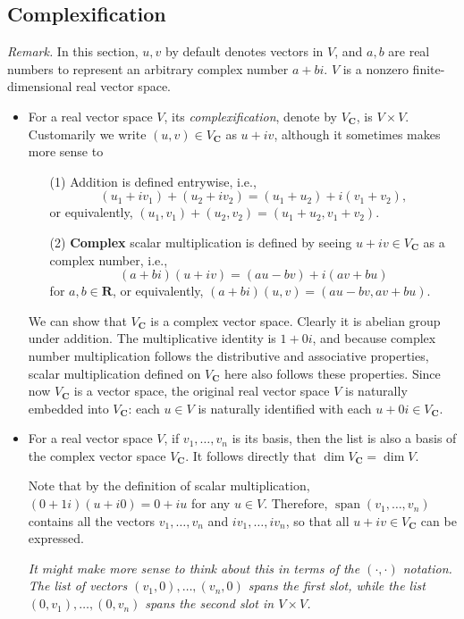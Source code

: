 \documentclass[11pt]{article}
\newcommand{\df}[1]{\textit{\textsf{#1}}}
\newcommand{\R}{\mathbf{R}}
\newcommand{\C}{\mathbf{C}}
\newcommand{\s}{\operatorname{span}}
\renewcommand{\d}{\dim}
\begin{document}
\subsection{Complexification}
\textit{Remark.} In this section, $u,v$ by default denotes vectors in $V$, and $a,b$ are real numbers to represent an arbitrary complex number $a+bi$. $V$ is a nonzero finite-dimensional real vector space.
\begin{itemize}
    \item For a real vector space $V$, its \df{complexification}, denote by $V_\C$, is $V \times V$. Customarily we write $(u,v) \in V_\C$ as $u + iv$, although it sometimes makes more sense to \emph{}
    \begin{enumerate}
        \item [(1)] Addition is defined entrywise, i.e., \[(u_1+iv_1)+(u_2+iv_2)=(u_1+u_2)+i(v_1+v_2),\] or equivalently, $(u_1,v_1)+(u_2,v_2) = (u_1+u_2,v_1+v_2)$.
        \item [(2)] \textbf{Complex} scalar multiplication is defined by seeing $u+iv \in V_\C$ as a complex number, i.e., \[(a+bi)(u+iv) = (au-bv)+i(av+bu)\] for $a,b \in \R$, or equivalently, $(a+bi)(u,v) = (au-bv,av+bu)$.
    \end{enumerate}

    We can show that $V_\C$ is a complex vector space. Clearly it is abelian group under addition. The multiplicative identity is $1+0i$, and because complex number multiplication follows the distributive and associative properties, scalar multiplication defined on $V_\C$ here also follows these properties. Since now $V_\C$ is a vector space, the original real vector space $V$ is naturally embedded into $V_\C$: each $u \in V$ is naturally identified with each $u+0i \in V_\C$.
    \item For a real vector space $V$, if $v_1,\dots,v_n$ is its basis, then the list is also a basis of the complex vector space $V_\C$. It follows directly that $\d V_\C = \d V$.

    Note that by the definition of scalar multiplication, $(0+1i)(u+i0) = 0+iu$ for any $u \in V$. Therefore, $\s(v_1,\dots,v_n)$ contains all the vectors $v_1,\dots,v_n$ and $iv_1,\dots,iv_n$, so that all $u+iv \in V_\C$ can be expressed.
    
    \emph{It might make more sense to think about this in terms of the $(\cdot,\cdot)$ notation. The list of vectors $(v_1,0),\dots,(v_n,0)$ spans the first slot, while the list $(0,v_1),\dots,(0,v_n)$ spans the second slot in $V \times V$.}


\end{itemize}
\end{document}
